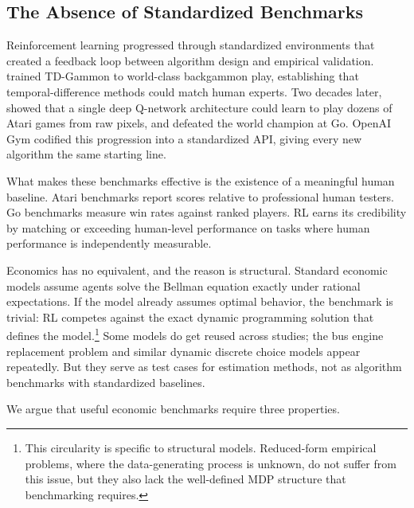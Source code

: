 
\subsection{The Absence of Standardized Benchmarks}

Reinforcement learning progressed through standardized environments that created a feedback loop between algorithm design and empirical validation. \citet{tesauro1994} trained TD-Gammon to world-class backgammon play, establishing that temporal-difference methods could match human experts. Two decades later, \citet{mnih2015} showed that a single deep Q-network architecture could learn to play dozens of Atari games from raw pixels, and \citet{Silver2016, Silver2017} defeated the world champion at Go. OpenAI Gym \citep{brockman2016} codified this progression into a standardized API, giving every new algorithm the same starting line.

What makes these benchmarks effective is the existence of a meaningful human baseline. Atari benchmarks report scores relative to professional human testers. Go benchmarks measure win rates against ranked players. RL earns its credibility by matching or exceeding human-level performance on tasks where human performance is independently measurable.

Economics has no equivalent, and the reason is structural. Standard economic models assume agents solve the Bellman equation exactly under rational expectations. If the model already assumes optimal behavior, the benchmark is trivial: RL competes against the exact dynamic programming solution that defines the model.\footnote{This circularity is specific to structural models. Reduced-form empirical problems, where the data-generating process is unknown, do not suffer from this issue, but they also lack the well-defined MDP structure that benchmarking requires.} Some models do get reused across studies; the \citet{Rust1987} bus engine replacement problem and similar dynamic discrete choice models appear repeatedly. But they serve as test cases for estimation methods, not as algorithm benchmarks with standardized baselines.

We argue that useful economic benchmarks require three properties.

